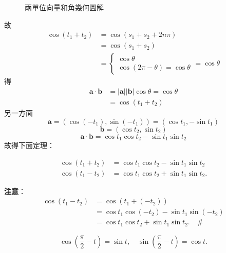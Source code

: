\begin{figure}[H]
\caption{兩單位向量和角幾何圖解}
\label{fig:b3s-fig3-46}
\end{figure}

故
\begin{align*}
\cos(t_1 + t_2) &= \cos(s_1 + s_2 + 2n\pi) \\
&= \cos(s_1 + s_2) \\
&= \begin{cases} \cos\theta \\ \cos(2\pi - \theta) = \cos\theta \end{cases} = \cos\theta
\end{align*}
得
\begin{align*}
\mathbf{a}\cdot\mathbf{b} &= |\mathbf{a}||\mathbf{b}|\cos\theta = \cos\theta \\
&= \cos(t_1 + t_2)
\end{align*}
另一方面
\[ \mathbf{a} = (\cos(-t_1), \sin(-t_1)) = (\cos t_1, -\sin t_1) \]
\[ \mathbf{b} = (\cos t_2, \sin t_2) \]
\[ \mathbf{a}\cdot\mathbf{b} = \cos t_1\cos t_2 - \sin t_1\sin t_2 \]
故得下面定理：

\begin{theorem}[餘弦和角公式]
\begin{align*}
\cos(t_1 + t_2) &= \cos t_1\cos t_2 - \sin t_1\sin t_2 \\
\cos(t_1 - t_2) &= \cos t_1\cos t_2 + \sin t_1\sin t_2.
\end{align*}
\end{theorem}

\textbf{注意}：
\begin{align*}
\cos(t_1 - t_2) &= \cos(t_1 + (-t_2)) \\
&= \cos t_1\cos(-t_2) - \sin t_1\sin(-t_2) \\
&= \cos t_1\cos t_2 + \sin t_1\sin t_2. \quad \#
\end{align*}

\begin{proposition}
\[ \cos\left(\frac{\pi}{2} - t\right) = \sin t, \quad \sin\left(\frac{\pi}{2} - t\right) = \cos t. \]
\end{proposition}

